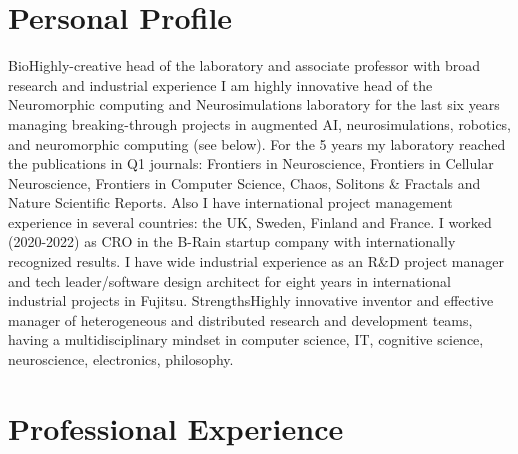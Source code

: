 \documentclass{moderncv}
\begin{document}
%
    \makecvtitle


    \section{Personal Profile}

    \cventry
    {Bio}{Highly-creative head of the laboratory and associate professor with broad research and industrial experience}{}{}{}
    {I am highly innovative head of the Neuromorphic computing and Neurosimulations laboratory for the last six years managing breaking-through projects in augmented AI, neurosimulations, robotics, and neuromorphic computing (see below).
      For the 5 years my laboratory reached the publications in Q1 journals: Frontiers in Neuroscience, Frontiers in Cellular Neuroscience, Frontiers in Computer Science, Chaos, Solitons \& Fractals and Nature Scientific Reports. 
      Also I have international project management experience in several countries: the UK, Sweden, Finland and France. I worked (2020-2022) as CRO in the B-Rain startup company with internationally recognized results.
    I have wide industrial experience as an R\&D project manager and tech leader/software design architect for eight years in international industrial projects in Fujitsu.}
    \cvitem
    {Strengths}{\small Highly innovative inventor and effective manager of heterogeneous and distributed research and development teams, having a multidisciplinary mindset in computer science, IT, cognitive science, neuroscience, electronics, philosophy.}
    
    \section{Professional Experience}
\end{document}
